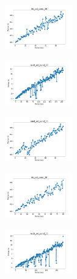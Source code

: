 \begin{figure}[H]    
    \centering
    \begin{subfigure}
        \centering
        \includegraphics[width=0.32\textwidth]{img/bl/iris_set_const_20_949004259_time.png}
    \end{subfigure}
    \hfill
    \begin{subfigure}
        \centering
        \includegraphics[width=0.32\textwidth]{img/bl/ecoli_set_const_20_949004259_time.png}
    \end{subfigure}
    \hfill
    \begin{subfigure}
        \centering
        \includegraphics[width=0.32\textwidth]{img/bl/rand_set_const_20_949004259_time.png}
    \end{subfigure}
    \hfill
    \begin{subfigure}
        \centering
        \includegraphics[width=0.32\textwidth]{img/bl/iris_set_const_20_589741062_time.png}
    \end{subfigure}
    \hfill
    \begin{subfigure}
        \centering
        \includegraphics[width=0.32\textwidth]{img/bl/ecoli_set_const_20_589741062_time.png}

\end{subfigure}
\end{figure}

